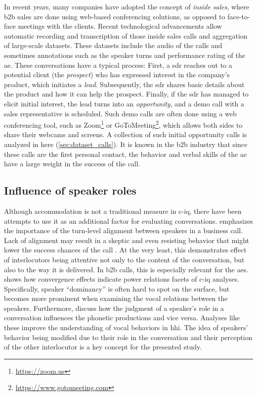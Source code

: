In recent years, many companies have adopted the concept of \emph{inside sales}, where \ac{b2b} sales are done using web-based conferencing solutions, as opposed to face-to-face meetings with the clients.
Recent technological advancements allow automatic recording and transcription of those inside sales calls and aggregation of large-scale datasets.
These datasets include the audio of the calls and sometimes annotations such as the speaker turns and performance rating of the \ac{ae}.
These conversations have a typical process:
First, a \ac{sdr} reaches out to a potential client (the \emph{prospect}) who has expressed interest in the company's product, which initiates a \emph{lead}.
Subsequently, the \ac{sdr} shares basic details about the product and how it can help the prospect.
Finally, if the \ac{sdr} has managed to elicit initial interest, the lead turns into an \emph{opportunity}, and a demo call with a sales representative is scheduled.
Such demo calls are often done using a web conferencing tool, such as Zoom\footnote{\url{https://zoom.us}} or GoToMeeting\footnote{\url{https://www.gotomeeting.com}}, which allows both sides to share their webcams and screens.
A collection of such initial opportunity calls is analyzed in here (\cref{sec:dataset_calls}).
It is known in the \ac{b2b} industry that since these calls are the first personal contact, the behavior and verbal skills of the \ac{ae} have a large weight in the success of the call.

\subsection{Influence of speaker roles}
\label{subsec:speaker_roles_and_influences}

Although accommodation is not a traditional measure in \ac{c-iq}, there have been attempts to use it as an additional factor for evaluating conversations.
\citet{Glaser2016conversational} emphasizes the importance of the turn-level alignment between speakers in a business call.
Lack of alignment may result in a skeptic and even resisting behavior that might lower the success chances of the call \citep[see also Table 2 in][]{Glaser2014conversational}.
At the very least, this demonstrates effect of interlocutors being attentive not only to the content of the conversation, but also to the way it is delivered.
In \ac{b2b} calls, this is especially relevant for the \acp{ae}.
\citet{SilberVarod2018human} shows how convergence effects indicate power relations facets of \ac{c-iq} analyses.
Specifically, speaker \enquote{dominancy} is often hard to spot on the surface, but becomes more prominent when examining the vocal relations between the speakers.
Furthermore, \citet{Abrego2011effects} discuss how the judgment of a speaker's role in a conversation influences the phonetic productions and vice versa.
Analyses like these improve the understanding of vocal behaviors in \ac{hhi}.
The idea of speakers' behavior being modified due to their role in the conversation and their perception of the other interlocutor is a key concept for the presented study.

